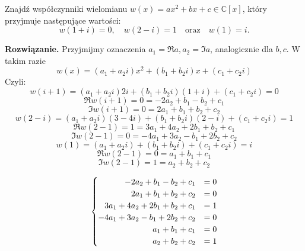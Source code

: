 \documentclass[]{sinol}
\begin{document}
    \begin{zadanie}
        Znajdź współczynniki wielomianu \( w(x) = ax^2 + bx + c \in \mathbb{C}[x] \), który przyjmuje następujące wartości:
        \[
        w(1 + i) = 0, \quad w(2 - i) = 1 \quad \text{oraz} \quad w(1) = i.
        \]

        \textbf{Rozwiązanie.}
        Przyjmijmy oznaczenia $a_1 = \Re a, a_2 = \Im a$, analogicznie dla $b, c$. W takim razie $$w(x) = (a_1+a_2i)x^2 + (b_1 + b_2i)x + (c_1 + c_2i)$$
        Czyli:
        $$w(i+1)=(a_1+a_2i)2i + (b_1 + b_2i)(1+i) + (c_1 + c_2i)=0$$
        $$\Re w(i+1) = 0 = -2a_2 + b_1 - b_2 + c_1$$
        $$\Im w(i+1) = 0 = 2a_1 + b_1 + b_2 + c_2$$
        $$w(2-i)=(a_1+a_2i)(3-4i) + (b_1 + b_2i)(2-i) + (c_1 + c_2i)=1$$
        $$\Re w(2-1) = 1 = 3a_1+4a_2+2b_1+b_2+c_1$$
        $$\Im w(2-1) = 0 = -4a_1 + 3a_2 - b_1 + 2b_2+c_2$$
        $$w(1)=(a_1+a_2i) + (b_1 + b_2i) + (c_1 + c_2i)=i$$
        $$\Re w(2-1) = 0 = a_1 + b_1 + c_1$$
        $$\Im w(2-1) = 1 = a_2 + b_2 + c_2$$

        \[
        \begin{cases}
           \hfill  -2a_2 + b_1 - b_2 + c_1 & = 0 \\ 
            \hfill 2a_1 + b_1 + b_2 + c_2 & = 0 \\
              \hfill 3a_1+4a_2+2b_1+b_2+c_1 & = 1 \\
              \hfill -4a_1 + 3a_2 - b_1 + 2b_2+c_2 & = 0 \\
             \hfill a_1 + b_1 + c_1 & = 0 \\
             \hfill a_2 + b_2 + c_2 & = 1 \\  
        \end{cases}
        \]


\end{zadanie}
\end{document}
